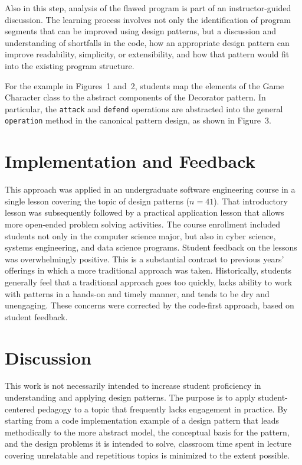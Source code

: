 \documentclass[conference]{IEEEtran}
\begin{document}
Also in this step, analysis of the flawed program is part of an instructor-guided discussion. The learning process involves not only the identification of program segments that can be improved using design patterns, but a discussion and understanding of shortfalls in the code, how an appropriate design pattern can improve readability, simplicity, or extensibility, and how that pattern would fit into the existing program structure.

For the example in Figures~1 and~2, students map the elements of the Game Character class to the abstract components of the Decorator pattern. In particular, the {\texttt{attack}} and {\texttt{defend}} operations are abstracted into the general {\texttt{operation}} method in the canonical pattern design, as shown in Figure~3.

\section{Implementation and Feedback}

This approach was applied in an undergraduate software engineering course in a single lesson covering the topic of design patterns ($n=41$). That introductory lesson was subsequently followed by a practical application lesson that allows more open-ended problem solving activities. The course enrollment included students not only in the computer science major, but also in cyber science, systems engineering, and data science programs. Student feedback on the lessons was overwhelmingly positive. This is a substantial contrast to previous years' offerings in which a more traditional approach was taken. Historically, students generally feel that a traditional approach goes too quickly, lacks ability to work with patterns in a hands-on and timely manner, and tends to be dry and unengaging. These concerns were corrected by the code-first approach, based on student feedback.

\section{Discussion}

This work is not necessarily intended to increase student proficiency in understanding and applying design patterns. The purpose is to apply student-centered pedagogy to a topic that frequently lacks engagement in practice. By starting from a code implementation example of a design pattern that leads methodically to the more abstract model, the conceptual basis for the pattern, and the design problems it is intended to solve, classroom time spent in lecture covering unrelatable and repetitious topics is minimized to the extent possible.
\end{document}
